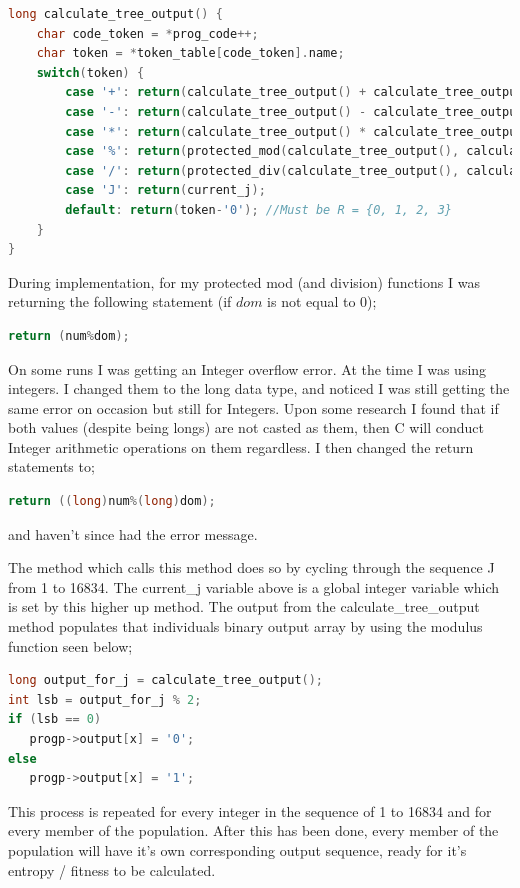 \documentclass[a4paper,10.5pt]{article}
\begin{document}
\begin{lstlisting}[language=C]
long calculate_tree_output() {
	char code_token = *prog_code++;
	char token = *token_table[code_token].name; 
	switch(token) {
		case '+': return(calculate_tree_output() + calculate_tree_output());
		case '-': return(calculate_tree_output() - calculate_tree_output());
		case '*': return(calculate_tree_output() * calculate_tree_output());
		case '%': return(protected_mod(calculate_tree_output(), calculate_tree_output()));
		case '/': return(protected_div(calculate_tree_output(), calculate_tree_output()));
		case 'J': return(current_j);
		default: return(token-'0'); //Must be R = {0, 1, 2, 3} 
	}
}
\end{lstlisting}

During implementation, for my protected mod (and division) functions I was returning the following statement (if $dom$ is not equal to 0); 

\begin{lstlisting}[language=C]
return (num%dom);
\end{lstlisting}

On some runs I was getting an Integer overflow error. At the time I was using integers. I changed them to the long data type, and noticed I was still getting the same error on occasion but still for Integers. Upon some research I found that if both values (despite being longs) are not casted as them, then C will conduct Integer arithmetic operations on them regardless. I then changed the return statements to;

\begin{lstlisting}[language=C]
return ((long)num%(long)dom);
\end{lstlisting}
\noindent and haven't since had the error message.

The method which calls this method does so by cycling through the sequence J from 1 to 16834. The current\_j variable above is a global integer variable which is set by this higher up method. The output from the calculate\_tree\_output method populates that individuals binary output array by using the modulus function seen below;

\begin{lstlisting}[language=C]
long output_for_j = calculate_tree_output();
int lsb = output_for_j % 2;
if (lsb == 0) 
   progp->output[x] = '0';
else
   progp->output[x] = '1';
\end{lstlisting}

This process is repeated for every integer in the sequence of 1 to 16834 and for every member of the population. After this has been done, every member of the population will have it's own corresponding output sequence, ready for it's entropy / fitness to be calculated. 
\end{document}
